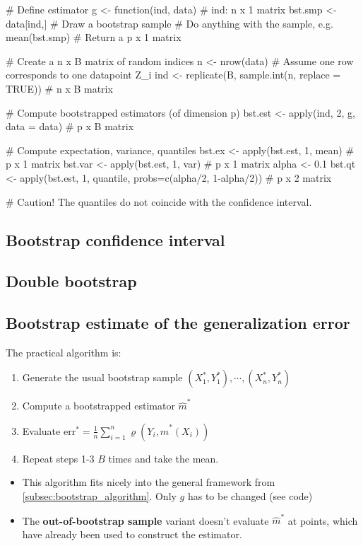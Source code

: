 \begin{code}
 # Define estimator
 g <- function(ind, data){ # ind: n x 1 matrix
    bst.smp <- data[ind,] # Draw a bootstrap sample
    # Do anything with the sample, e.g. mean(bst.smp)
    # Return a p x 1 matrix
 }
 
 # Create a n x B matrix of random indices
 n <- nrow(data) # Assume one row corresponds to one datapoint Z_i
 ind <- replicate(B, sample.int(n, replace = TRUE)) # n x B matrix
 
 # Compute bootstrapped estimators (of dimension p)
 bst.est <- apply(ind, 2, g, data = data) # p x B matrix
 
 # Compute expectation, variance, quantiles
 bst.ex  <- apply(bst.est, 1, mean) # p x 1 matrix
 bst.var <- apply(bst.est, 1, var)  # p x 1 matrix
 alpha <- 0.1
 bst.qt  <- apply(bst.est, 1, quantile, probs=c(alpha/2, 1-alpha/2)) # p x 2 matrix

 # Caution! The quantiles do not coincide with the confidence interval.
 \end{code}
 \subsection{Bootstrap confidence interval}
 
 \subsection{Double bootstrap}
 
 \subsection{Bootstrap estimate of the generalization error}
 \begin{theory}
  The practical algorithm is:
  \begin{enumerate}
   \item Generate the usual bootstrap sample $(X_1^{\ast}, Y_1^{\ast}), \cdots, (X_n^{\ast}, Y_n^{\ast})$
   \item Compute a bootstrapped estimator $\hat{m}^{\ast}$
   \item Evaluate $\text{err}^{\ast} = \frac{1}{n} \sum_{i=1}^n \varrho(Y_i, \hat{m}^{\ast}(X_i))$
   \item Repeat steps 1-3 $B$ times and take the mean.
  \end{enumerate}
  \begin{itemize}
   \item This algorithm fits nicely into the general framework from \ref{subsec:bootstrap_algorithm}. Only $g$ has to be changed (see code)
   \item The \textbf{out-of-bootstrap sample} variant doesn't evaluate $\hat{m}^{\ast}$ at points, which have already been used to construct the estimator.
  \end{itemize}
 \end{theory}

